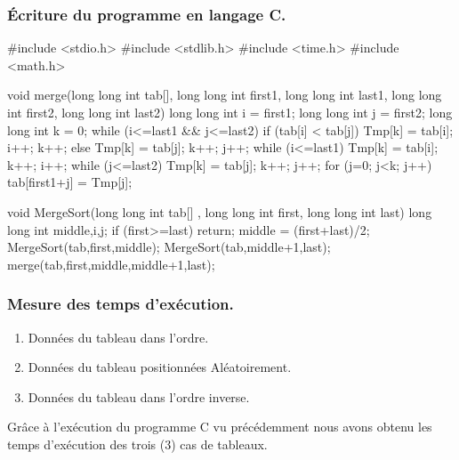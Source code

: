 \documentclass[12pt]{article}
\begin{document}
\subsubsection{Écriture du programme en langage C.}
\begin{sql}
#include <stdio.h>
#include <stdlib.h>
#include <time.h>
#include <math.h>

void merge(long long int tab[], long long int first1, long long int last1, long long int first2, long long int last2)
    {
        long long int i = first1;
        long long int j = first2;
        long long int k = 0;
        while (i<=last1 && j<=last2)
        {
            if (tab[i] < tab[j])
            {
                Tmp[k] = tab[i];
                i++;
                k++;
            }
            else
            {
                Tmp[k] = tab[j];
                k++;
                j++;
            }
        }
        while (i<=last1) 
        {
            Tmp[k] = tab[i];
            k++;
            i++;
        }
        while (j<=last2)
        {
            Tmp[k] = tab[j];
            k++;
            j++;
        }
        for (j=0; j<k; j++)
            tab[first1+j] = Tmp[j];
    }


void MergeSort(long long int tab[] , long long int first, long long int last)
    {
        long long int middle,i,j;
        if (first>=last) return;
        middle = (first+last)/2;
        MergeSort(tab,first,middle);
        MergeSort(tab,middle+1,last);
        merge(tab,first,middle,middle+1,last);
    }
\end{sql}

\subsubsection{Mesure des temps d'exécution.}
\begin{enumerate}
	\item Données du tableau dans l'ordre.
	\item Données du tableau positionnées Aléatoirement.
	\item Données du tableau dans l'ordre inverse.
\end{enumerate}
Grâce à l'exécution du programme C vu précédemment nous avons obtenu les temps d'exécution des trois (3) cas de tableaux.
\end{document}
